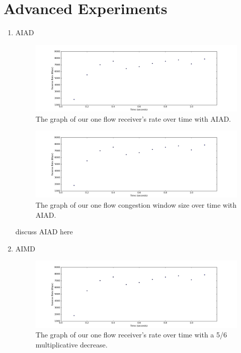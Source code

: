 \documentclass[11pt]{article}
\begin{document}
\section{Advanced Experiments}

\begin{enumerate}
\item AIAD

\begin{figure}[H]
\caption{The graph of our one flow receiver's rate over time with AIAD.}
  \label{figure13}
    \centering
    \includegraphics[width=\linewidth]{1f_rate.png}
\end{figure}

\begin{figure}[H]
\caption{The graph of our one flow congestion window size over time with AIAD.}
  \label{figure14}
    \centering
    \includegraphics[width=\linewidth]{1f_rate.png}
\end{figure}


discuss AIAD here

\bigskip
\item AIMD

\begin{figure}[H]
\caption{The graph of our one flow receiver's rate over time with a 5/6 multiplicative decrease.}
  \label{figure15}
    \centering
    \includegraphics[width=\linewidth]{1f_rate.png}
\end{figure}


\end{enumerate}
\end{document}
